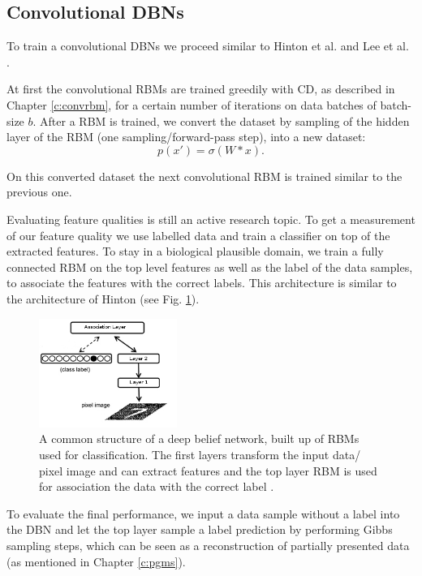 \subsection{Convolutional DBNs} \label{c:convdbns}

To train a convolutional DBNs we proceed similar to Hinton et al. and Lee et al. \cite{hinton2006fast} \cite{lee2009convolutional}.

At first the convolutional RBMs are trained greedily with CD, as described in Chapter \ref{c:convrbm}, for a certain number of iterations on data batches of batch-size $b$.
After a RBM is trained, we convert the dataset by sampling of the hidden layer of the RBM (one sampling/forward-pass step), into a new dataset:
\[
p(x') = \sigma(W * x) .
\]

On this converted dataset the next convolutional RBM is trained similar to the previous one.

Evaluating feature qualities is still an active research topic.
To get a measurement of our feature quality we use labelled data and train a classifier on top of the extracted features.
To stay in a biological plausible domain, we train a fully connected RBM on the top level features as well as the label of the data samples, to associate the features with the correct labels.
This architecture is similar to the architecture of Hinton \cite{hinton2006fast} (see Fig. \ref{fig:dbnmnist}).

\begin{figure}
	\centering
    	\includegraphics[width=0.4\textwidth]{imgs/dbn_mnist.png} 
    \caption[A common structure of a deep belief network.]{A common structure of a deep belief network, built up of RBMs used for classification. The first layers transform the input data/ pixel image and can extract features and the top layer RBM is used for association the data with the correct label \cite{Zorzi2013Modeling}.}
	\label{fig:dbnmnist}
\end{figure}

To evaluate the final performance, we input a data sample without a label into the DBN and let the top layer sample a label prediction by performing Gibbs sampling steps, which can be seen as a reconstruction of partially presented data (as mentioned in Chapter \ref{c:pgms}).


